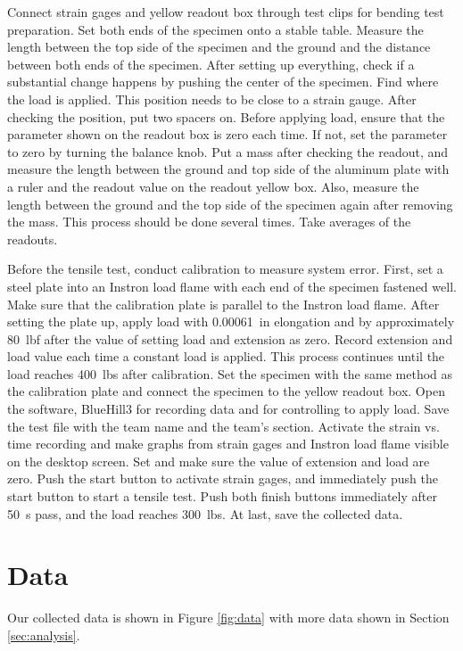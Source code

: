 \documentclass[12 pt]{report}
\begin{document}
Connect strain gages and yellow readout box through test clips for bending test preparation. Set both ends of the specimen onto a stable table. Measure the length between the top side of the specimen and the ground and the distance between both ends of the specimen. After setting up everything, check if a substantial change happens by pushing the center of the specimen. Find where the load is applied. This position needs to be close to a strain gauge. After checking the position, put two spacers on. Before applying load, ensure that the parameter shown on the readout box is zero each time. If not, set the parameter to zero by turning the balance knob. Put a mass after checking the readout, and measure the length between the ground and top side of the aluminum plate with a ruler and the readout value on the readout yellow box. Also, measure the length between the ground and the top side of the specimen again after removing the mass. This process should be done several times. Take averages of the readouts. 

Before the tensile test, conduct calibration to measure system error. First, set a steel plate into an Instron load flame with each end of the specimen fastened well. Make sure that the calibration plate is parallel to the Instron load flame. After setting the plate up, apply load with \qty{0.00061}{in} elongation and by approximately \qty{80}{lbf} after the value of setting load and extension as zero. Record extension and load value each time a constant load is applied. This process continues until the load reaches \qty{400}{lbs} after calibration. Set the specimen with the same method as the calibration plate and connect the specimen to the yellow readout box. Open the software, BlueHill3 for recording data and for controlling to apply load. Save the test file with the team name and the team’s section. Activate the strain vs. time recording and make graphs from strain gages and Instron load flame visible on the desktop screen. Set and make sure the value of extension and load are zero. Push the start button to activate strain gages, and immediately push the start button to start a tensile test. Push both finish buttons immediately after \qty{50}{s} pass, and the load reaches \qty{300}{lbs}. At last, save the collected data. 

\section{Data} \label{sec:data}
Our collected data is shown in Figure \ref{fig:data} with more data shown in Section \ref{sec:analysis}.
\end{document}

